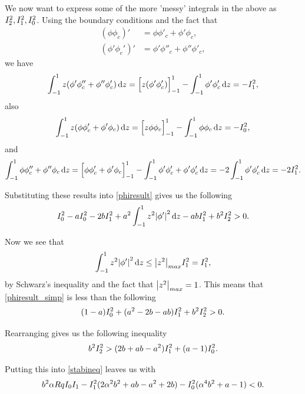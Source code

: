 We now want to express some of the more 'messy' integrals in the above as $ \I{2}, \I{1}, \I{0} $. Using the boundary conditions and the fact that 
\begin{align}
    (\phi \phi_c)' &= \phi \phi'_c + \phi' \phi_c, \nonumber\\
    (\phi' \phi_c')' &= \phi' \phi''_c + \phi'' \phi'_c,
\end{align} 
we have
\begin{equation}
    \inte{1}{-1}{z (\phi' \phi''_c + \phi'' \phi'_c)}{z} = \ieval{1}{-1}{z (\phi' \phi'_c)} - \inte{1}{-1}{\phi' \phi'_c}{z} = - \I{1},
\end{equation}
also
\begin{align}
    \inte{1}{-1}{z (\phi \phi'_c + \phi' \phi_c)}{z} = \ieval{1}{-1}{z \phi \phi_c} - \inte{1}{-1}{\phi \phi_c}{z} = -\I{0}, 
\end{align}
and
\begin{align}
    \inte{1}{-1}{\phi \phi''_c + \phi'' \phi_c}{z} = \ieval{1}{-1}{\phi \phi'_c + \phi' \phi_c} - \inte{1}{-1}{\phi' \phi'_c + \phi' \phi'_c}{z} = -2 \inte{1}{-1}{\phi' \phi'_c}{z} = -2 \I{1}. 
\end{align}

Substituting these results into \eqref{phiresult} gives us the following
\begin{equation}
    \I{0} - a \I{0} - 2b \I{1} + a^2 \inte{1}{-1}{z^2 \abs{\phi'}^2}{z} - ab \I{1} + b^2 \I{2} > 0.
    \label{phiresult_simp}
\end{equation}

Now we see that 
\begin{equation}
    \inte{1}{-1}{z^2 \abs{\p'}^2}{z} \leq \abs{z^2}_{max} \I{1} = \I{1},
\end{equation}
by Schwarz's inequality and the fact that $ \abs{z^2}_{max} = 1 $. This means that \eqref{phiresult_simp} is less than the following
\begin{equation}
    (1 - a) \I{0} + (a^2 - 2b - ab) \I{1} + b^2 \I{2} > 0. 
\end{equation}

Rearranging gives us the following inequality
\begin{equation}
    b^2 \I{2} > (2b + ab - a^2) \I{1} + (a - 1) \I{0}.
    \label{phiineq}
\end{equation}

Putting this into \eqref{stabineq} leaves us with
\begin{equation}
    b^2 \al R q I_0 I_1 - \I{1} (2 \al^2 b^2 + ab - a^2 + 2b) - \I{0} (\al^4 b^2 + a - 1) < 0.
\end{equation}

